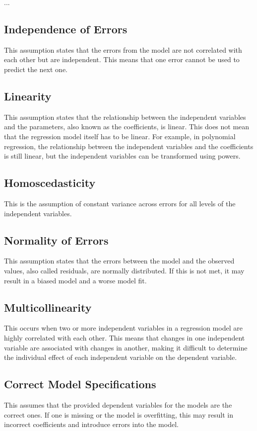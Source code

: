 
...

\subsection{Independence of Errors}
This assumption states that the errors from the model are not correlated with each other but are independent. This means that one error cannot be used to predict the next one.

\subsection{Linearity}
This assumption states that the relationship between the independent variables and the parameters, also known as the coefficients, is linear. This does not mean that the regression model itself has to be linear. For example, in polynomial regression, the relationship between the independent variables and the coefficients is still linear, but the independent variables can be transformed using powers.

\subsection{Homoscedasticity}
This is the assumption of constant variance across errors for all levels of the independent variables.

\subsection{Normality of Errors}
This assumption states that the errors between the model and the observed values, also called residuals, are normally distributed. If this is not met, it may result in a biased model and a worse model fit.

\subsection{Multicollinearity}
This occurs when two or more independent variables in a regression model are highly correlated with each other. This means that changes in one independent variable are associated with changes in another, making it difficult to determine the individual effect of each independent variable on the dependent variable.

\subsection{Correct Model Specifications}
This assumes that the provided dependent variables for the models are the correct ones. If one is missing or the model is overfitting, this may result in incorrect coefficients and introduce errors into the model.